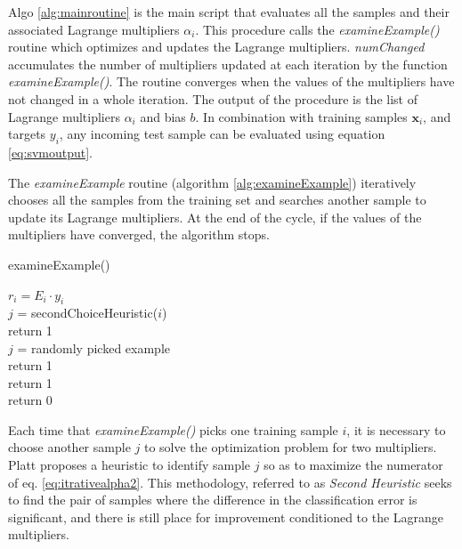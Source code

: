 \documentclass{ipol}
\def\x{{\mathbf x}}
\begin{document}
Algo \ref{alg:mainroutine} is the main script that evaluates all the samples and their associated Lagrange multipliers $\alpha_i$.
This procedure calls the \textit{examineExample()} routine which optimizes and updates the Lagrange multipliers.
\textit{numChanged} accumulates the number of multipliers updated at each iteration by the function \textit{examineExample()}.
The routine converges when the values of the multipliers have not changed in a whole iteration.
The output of the procedure is the list of Lagrange multipliers $\alpha_i$ and bias $b$.
In combination with training samples $\x_i$, and targets $y_i$, any incoming test sample can be evaluated using equation \ref{eq:svmoutput}.



The \textit{examineExample} routine (algorithm \ref{alg:examineExample}) iteratively chooses all the samples from the training set and searches another sample to update its Lagrange multipliers.
At the end of the cycle, if the values of the multipliers have converged, the algorithm stops.

\begin{algorithm}[!htbp]
\small
\caption{examineExample()}
\DontPrintSemicolon
{}
$r_i = E_i \cdot y_i$\\
 {
	 {
		$j$ = secondChoiceHeuristic($i$) \\
		 {
			return 1\\
		}
		 {
			$j$ = randomly picked example \\
			 {
				return 1\\
				}
		}
	}
	 {
		 {
			return 1\\
		}
	}
}
return 0\\
\label{alg:examineExample}
\end{algorithm}

Each time that \textit{examineExample()} picks one training sample $i$, it is necessary to choose another sample $j$ to solve the optimization problem for two multipliers.
Platt proposes a heuristic to identify sample $j$ so as to maximize the numerator of eq. \ref{eq:itrativealpha2}.
This methodology, referred to as \textit{Second Heuristic}  seeks to find the pair of samples where the difference in the classification error is significant, and there is still place for improvement conditioned to the Lagrange multipliers.
\end{document}
